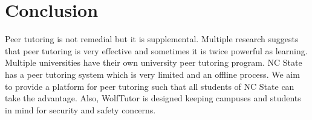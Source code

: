 \documentclass{sig-alternate-05-2015}
\begin{document}
\section{Conclusion}

Peer tutoring is not remedial but it is supplemental. Multiple research suggests that peer tutoring is very effective and sometimes it is twice powerful as learning. Multiple universities have their own university peer tutoring program. NC State has a peer tutoring system which is very limited and an offline process. We aim to provide a platform for peer tutoring such that all students of NC State can take the advantage. Also, WolfTutor is designed keeping campuses and students in mind for security and safety concerns.
%

\end{document}
